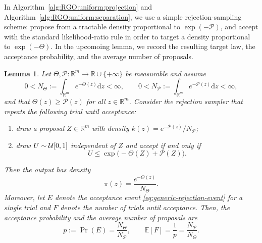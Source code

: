 \documentclass[11pt,letterpaper]{article}
\newcommand{\R}{\mathbb{R}}
\newcommand{\D}{\mathrm{d}}
\newtheorem{lemma}[thm]{Lemma}
\begin{document}





In Algorithm~\ref{alg:RGO:uniform:projection} and Algorithm~\ref{alg:RGO:uniform:separation}, we use a simple rejection-sampling scheme: propose from a tractable density proportional to $\exp(-\mathcal{P})$, and accept with the standard likelihood-ratio rule in order to target a density proportional to $\exp(-\Theta)$.
In the upcomoing lemma, we record the resulting target law, the acceptance probability, and the average number of proposals.

\begin{lemma}\label{lem:rejection} 
Let $\Theta,\mathcal{P}:\R^{m}\to\R\cup\{+\infty\}$ be measurable and assume
\[
0<N_\Theta:=\int_{\R^m} e^{-\Theta(z)}  \D z<\infty,
\qquad
0<N_{\mathcal{P}}:=\int_{\R^m} e^{-\mathcal{P}(z)}  \D z<\infty,
\]
and that $\Theta(z)\ge \mathcal{P}(z)$ for all $z\in\R^m$.
Consider the rejection sampler that repeats the following trial until acceptance:
\begin{enumerate}
    \item draw a proposal $Z\in\R^m$ with density $k(z)=e^{-\mathcal{P}(z)}/N_{\mathcal{P}}$;
    \item draw $U\sim{\cal U}[0,1]$ independent of $Z$ and accept if and only if
    \begin{equation}\label{eq:generic-rejection-event}
        U\le \exp\bigl(-\Theta(Z)+\mathcal{P}(Z)\bigr).
    \end{equation}
\end{enumerate}
Then the output has density
\[
\pi(z)=\frac{e^{-\Theta(z)}}{N_\Theta}.
\]
Moreover, let $E$ denote the acceptance event \eqref{eq:generic-rejection-event} for a single trial and $F$ denote the number of trials until acceptance. Then, the acceptance probability and the average number of proposals are
\begin{equation}\label{eq:generic-accept-rate}
p:=\Pr(E)=\frac{N_\Theta}{N_{\mathcal{P}}},
\qquad
\mathbb{E}[F] =\frac{1}{p}=\frac{N_{\mathcal{P}}}{N_\Theta}.
\end{equation}
\end{lemma}
\end{document}
